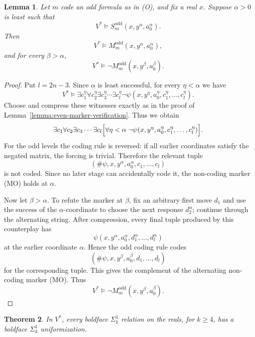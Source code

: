 \documentclass[a4paper,11pt]{article}
\newtheorem{theorem}{Theorem}[section]
\newtheorem{lemma}[theorem]{Lemma}
\begin{document}
\begin{lemma}\label{lemma:odd-marker-verification}
Let $m$ code an odd formula as in \textup{(O)}, and fix a real $x$.  Suppose $\alpha>0$ is least such that
\[
V^*\models S^{\mathrm{odd}}_m(x,y^\alpha,a_0^\alpha).
\]
Then
\[
V^*\models M^{\mathrm{odd}}_m(x,y^\alpha,a_0^\alpha),
\]
and for every $\beta>\alpha$,
\[
V^*\models \neg M^{\mathrm{odd}}_m(x,y^\beta,a_0^\beta).
\]
\end{lemma}

\begin{proof}
Put $l=2n-3$.  Since $\alpha$ is least successful, for every $\eta<\alpha$ we have
\[
V^*\models
\exists c_1^\eta\forall c_2^\eta\exists c_3^\eta\cdots\exists c_l^\eta
\neg\psi(x,y^\eta,a_0^\eta,c_1^\eta,\ldots,c_l^\eta).
\]
Choose and compress these witnesses exactly as in the proof of Lemma~\ref{lemma:even-marker-verification}.  Thus we obtain
\[
\exists c_1\forall c_2\exists c_3\cdots\exists c_l
\Bigl[\forall\eta<\alpha\;\neg\psi(x,y^\eta,a_0^\eta,c_1^\eta,\ldots,c_l^\eta)\Bigr].
\]
For the odd levels the coding rule is reversed: if all earlier coordinates satisfy the negated matrix, the forcing is trivial.  Therefore the relevant tuple
\[
(\#\psi,x,y^\alpha,a_0^\alpha,c_1,\ldots,c_l)
\]
is not coded.  Since no later stage can accidentally code it, the non-coding marker (MO) holds at $\alpha$.

Now let $\beta>\alpha$.  To refute the marker at $\beta$, fix an arbitrary first move $d_1$ and use the success of the $\alpha$-coordinate to choose the next response $d_2^\alpha$; continue through the alternating string.  After compression, every final tuple produced by this counterplay has
\[
\psi(x,y^\alpha,a_0^\alpha,d_1^\alpha,\ldots,d_l^\alpha)
\]
at the earlier coordinate $\alpha$.  Hence the odd coding rule codes
\[
(\#\psi,x,y^\beta,a_0^\beta,d_1,\ldots,d_l)
\]
for the corresponding tuple.  This gives the complement of the alternating non-coding marker (MO).  Thus
\[
V^*\models \neg M^{\mathrm{odd}}_m(x,y^\beta,a_0^\beta).
\]
\end{proof}

\begin{theorem}\label{theorem:global-sigma-uniformization-final}
In $V^*$, every boldface $\Sigma^1_k$ relation on the reals, for $k\geq 4$, has a boldface $\Sigma^1_k$ uniformization.
\end{theorem}
\end{document}
